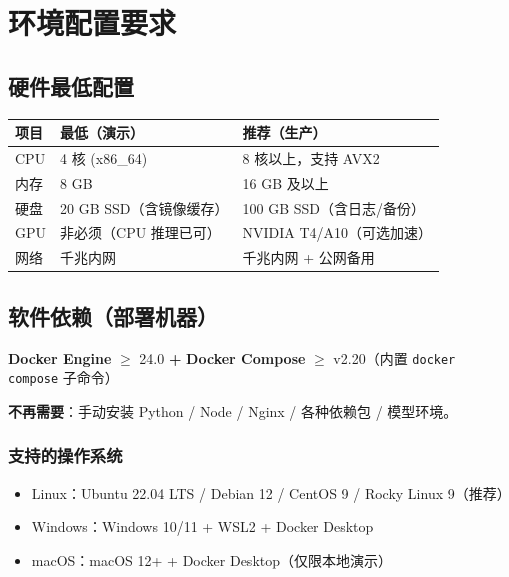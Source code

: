 \documentclass[UTF8,a4paper,11pt]{ctexart}
\begin{document}
\section{环境配置要求}

\subsection{硬件最低配置}

\begin{longtable}{L{3.0cm} L{4.5cm} L{5.5cm}}
\toprule
\textbf{项目} & \textbf{最低（演示）} & \textbf{推荐（生产）} \\
\midrule
\endhead
CPU      & 4 核 (x86\_64)            & 8 核以上，支持 AVX2 \\
内存      & 8 GB                      & 16 GB 及以上 \\
硬盘      & 20 GB SSD（含镜像缓存）    & 100 GB SSD（含日志/备份） \\
GPU      & 非必须（CPU 推理已可）      & NVIDIA T4/A10（可选加速） \\
网络      & 千兆内网                  & 千兆内网 + 公网备用 \\
\bottomrule
\end{longtable}

\subsection{软件依赖（部署机器）}

\begin{infobox}[只需两样东西]
\textbf{Docker Engine} $\geq$ 24.0  \quad \textbf{+}  \quad
\textbf{Docker Compose} $\geq$ v2.20（内置 \texttt{docker compose} 子命令）

\smallskip
\textbf{不再需要}：手动安装 Python / Node / Nginx / 各种依赖包 / 模型环境。
\end{infobox}

\subsubsection{支持的操作系统}

\begin{itemize}[leftmargin=1.4em,itemsep=2pt]
  \item Linux：Ubuntu 22.04 LTS / Debian 12 / CentOS 9 / Rocky Linux 9（推荐）
  \item Windows：Windows 10/11 + WSL2 + Docker Desktop
  \item macOS：macOS 12+ + Docker Desktop（仅限本地演示）
\end{itemize}
\end{document}
